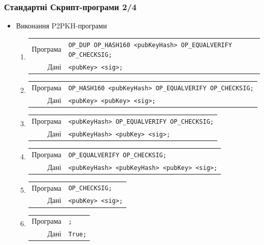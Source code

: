 \documentclass{beamer}
\begin{document}
\begin{frame}[fragile]
  \frametitle{Стандартні Скрипт-програми 2/4}
  \begin{itemize}
  \item Виконання P2PKH-програми
    \begin{enumerate}
    \item
      \begin{tabular}{rl}
        Програма &\tiny\texttt{OP_DUP OP_HASH160 <pubKeyHash> OP_EQUALVERIFY OP_CHECKSIG;} \\
        Дані &\tiny\texttt{<pubKey> <sig>;} \\
      \end{tabular}
    \item
      \begin{tabular}{rl}
        Програма &\tiny\texttt{OP_HASH160 <pubKeyHash> OP_EQUALVERIFY OP_CHECKSIG;} \\
        Дані &\tiny\texttt{<pubKey> <pubKey> <sig>;} \\
      \end{tabular}
    \item
      \begin{tabular}{rl}
        Програма &\tiny\texttt{<pubKeyHash> OP_EQUALVERIFY OP_CHECKSIG;} \\
        Дані &\tiny\texttt{<pubKeyHash> <pubKey> <sig>;} \\
      \end{tabular}
    \item
      \begin{tabular}{rl}
        Програма &\tiny\texttt{OP_EQUALVERIFY OP_CHECKSIG;} \\
        Дані &\tiny\texttt{<pubKeyHash> <pubKeyHash> <pubKey> <sig>;} \\
      \end{tabular}
    \item
      \begin{tabular}{rl}
        Програма &\tiny\texttt{OP_CHECKSIG;} \\
        Дані &\tiny\texttt{<pubKey> <sig>;} \\
      \end{tabular}
    \item
      \begin{tabular}{rl}
        Програма &\tiny\texttt{;} \\
        Дані &\tiny\texttt{True;} \\
      \end{tabular}
    \end{enumerate}
  \end{itemize}
\end{frame}
\end{document}
